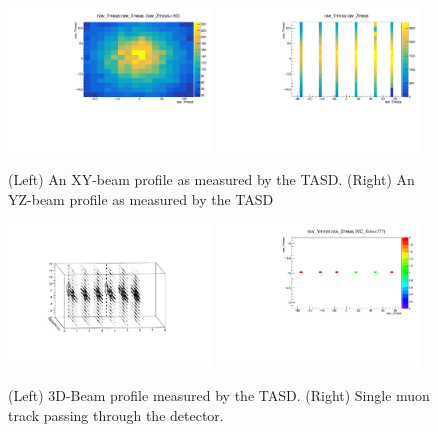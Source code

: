 \begin{figure}[h!]
\centering
\includegraphics[width=0.48\textwidth]{figures/nuphys/newFigures/beamXYplane1Hadron.pdf}
\includegraphics[width=0.48\textwidth]{figures/nuphys/newFigures/beamYZhadron.pdf}
\caption{(Left) An XY-beam profile as measured by the TASD. (Right) An YZ-beam profile as measured by the TASD}
\label{fig:TASDres2}
\end{figure}

\begin{figure}[h!]
\centering
\includegraphics[width=0.48\textwidth,trim = 5cm 5cm 5cm 5cm]{figures/nuphys/newFigures/beamPlot.pdf}
\includegraphics[width=0.48\textwidth]{figures/nuphys/newFigures/muonTrackYZ.pdf}
\caption{(Left) 3D-Beam profile measured by the TASD. (Right) Single muon track passing through the detector.}
\label{fig:TASDres1}
\end{figure}

